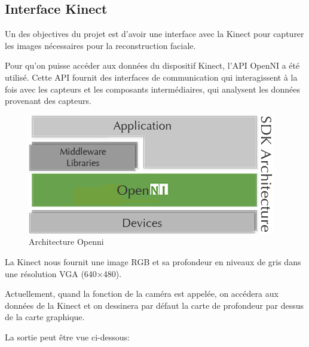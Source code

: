 \documentclass[a4paper,12pt]{article}
\begin{document}
\subsection*{Interface Kinect}

Un des objectives du projet est d’avoir une interface avec la Kinect
pour capturer les images nécessaires pour la reconstruction faciale.

Pour qu’on puisse accéder aux données du dispositif Kinect, l’API
OpenNI\cite{Openni2010} a été utilisé. Cette API fournit des
interfaces de communication qui interagissent à la fois avec les
capteurs et les composants intermédiaires, qui analysent les données
provenant des capteurs.

\begin{figure}[h!]
  \begin{center}
    \includegraphics[scale=0.4]{img/image03.png}
    \caption{Architecture Openni}
  \end{center}
\end{figure}


La Kinect nous fournit une image RGB et sa profondeur en niveaux de
gris dans une résolution VGA (640×480).

Actuellement, quand la fonction de la caméra est appelée, on accédera
aux données de la Kinect et on dessinera par défaut la carte de
profondeur par dessus de la carte graphique. 



La sortie peut être vue ci-dessous:
\end{document}
